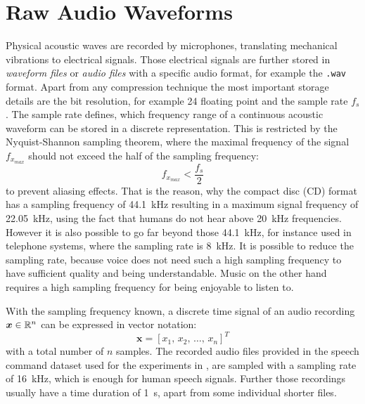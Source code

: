 
\section{Raw Audio Waveforms}\label{sec:signal_raw}
\thesisStateRevised
\thesisStateNew
Physical acoustic waves are recorded by microphones, translating mechanical vibrations to electrical signals. 
Those electrical signals are further stored in \emph{waveform files} or \emph{audio files} with a specific audio format, for example the \texttt{.wav} format.
Apart from any compression technique the most important storage details are the bit resolution, for example \SI{24}{\bit} floating point and the sample rate $f_s$. 
The sample rate defines, which frequency range of a continuous acoustic waveform can be stored in a discrete representation.
This is restricted by the Nyquist-Shannon sampling theorem, where the maximal frequency of the signal $f_{x_{max}}$ should not exceed the half of the sampling frequency: 
\begin{equation}\label{eq:signal_raw_nyquist}
  f_{x_{max}} < \frac{f_s}{2}
\end{equation}
to prevent aliasing effects.
That is the reason, why the compact disc (CD) format has a sampling frequency of \SI{44.1}{\kilo\hertz} resulting in a maximum signal frequency of \SI{22.05}{\kilo\hertz}, using the fact that humans do not hear above \SI{20}{\kilo\hertz} frequencies.
However it is also possible to go far beyond those \SI{44.1}{\kilo\hertz}, for instance used in telephone systems, where the sampling rate is \SI{8}{\kilo\hertz}.
It is possible to reduce the sampling rate, because voice does not need such a high sampling frequency to have sufficient quality and being understandable.
Music on the other hand requires a high sampling frequency for being enjoyable to listen to.

With the sampling frequency known, a discrete time signal of an audio recording $\bm{x} \in \mathbb{R}^n$ can be expressed in vector notation:
\begin{equation}\label{eq:signal_raw_x}
  \bm{x} = [x_1,\, x_2,\, \dots,\, x_n]^T
\end{equation}
with a total number of $n$ samples.
The recorded audio files provided in the speech command dataset \cite{Warden2018} used for the experiments in , are sampled with a sampling rate of \SI{16}{\kilo\hertz}, which is enough for human speech signals.
Further those recordings usually have a time duration of \SI{1}{\second}, apart from some individual shorter files.

